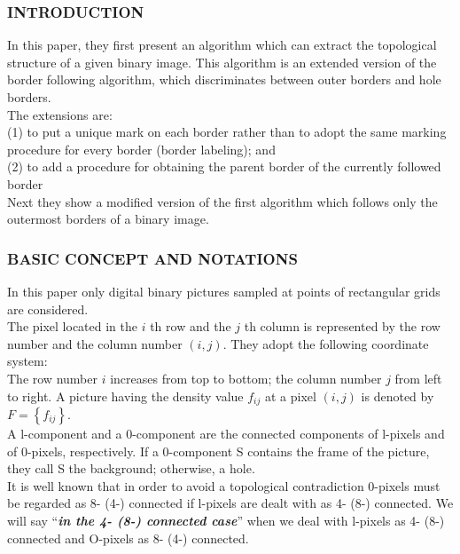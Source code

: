\documentclass[a4paper,12pt]{book}%
\begin{document}
\subsubsection{INTRODUCTION}
In this paper, they first present an algorithm which can extract the topological structure of a given binary image. This algorithm is an extended version of the border following algorithm, which discriminates between outer borders and hole borders.\\


The extensions are:\\
(1) to put a unique mark on each border rather than to adopt the same marking procedure for every border (border labeling); and\\
(2) to add a procedure for obtaining the parent border of the currently followed border\\

Next they show a modified version of the first algorithm which follows only the outermost borders of a binary image.


\subsubsection{BASIC CONCEPT AND NOTATIONS}

In this paper only digital binary pictures sampled at points of rectangular grids are considered.\\

The pixel located in the $i$ th row and the $j$ th column is represented by the row number and the column number $(i, j)$. They adopt the following coordinate system:\\

The row number $i$ increases from top to bottom; the column number $j$ from left to right. A picture having the density value
$f_{ij}$ at a pixel $(i,j)$ is denoted by $F= \left\{ f_{ij} \right\}$.\\

A l-component and a 0-component are the connected components of l-pixels and of 0-pixels, respectively. If a 0-component S contains the frame of the picture, they call S the background; otherwise, a hole.\\

It is well known that in order to avoid a topological contradiction 0-pixels must be regarded as 8- (4-) connected if l-pixels are dealt with as 4- (8-) connected. We will say ``\textbf{\textit{in the 4- (8-) connected case}}'' when we deal with l-pixels as 4- (8-) connected
and O-pixels as 8- (4-) connected.\\
\end{document}
